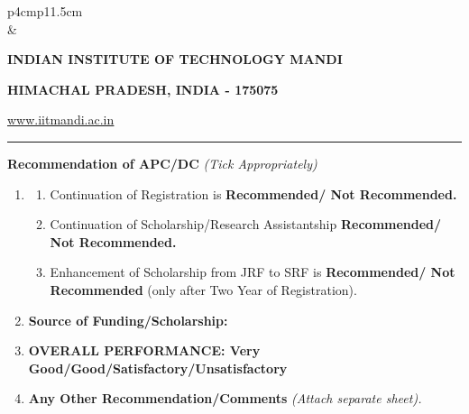 \documentclass[12 pt, a4paper]{article}
\newcommand{\HRule}{\rule{\linewidth}{1mm}}
\begin{document}
\pagestyle{empty}
\vskip 0.2cm
	\begin{tabular}{p{4cm}p{11.5cm}}
		  \\
		& \centering \large\bf\phantom{Empty line}\\ 
		\rule{0pt}{1pt} \centering \large\bf{INDIAN INSTITUTE OF TECHNOLOGY MANDI} \\
		\rule{0pt}{1pt} \centering \large\bf{HIMACHAL PRADESH, INDIA - 175075} \\
		\rule{0pt}{1pt} \centering \underline{\href{www.iitmandi.ac.in}{www.iitmandi.ac.in}}\\
	\end{tabular}
\noindent

{\raggedleft{}\HRule}
\textbf{Recommendation of APC/DC} \textit{(Tick Appropriately)}
\begin{enumerate}
	\item
	\begin{enumerate}
\item Continuation of Registration is \textbf{Recommended/ Not Recommended.}
\item Continuation of Scholarship/Research Assistantship \textbf{ Recommended/ Not Recommended.}
\item Enhancement of Scholarship from JRF to SRF is \textbf{Recommended/ Not Recommended } (only
after Two Year of Registration).
\end{enumerate}
\item
\textbf{Source of Funding/Scholarship:}

\item \textbf{OVERALL PERFORMANCE: Very Good/Good/Satisfactory/Unsatisfactory}
\item \textbf{Any Other Recommendation/Comments} \textit{(Attach separate sheet).}
\end{enumerate}
\vspace*{0.5cm}
\end{document}
